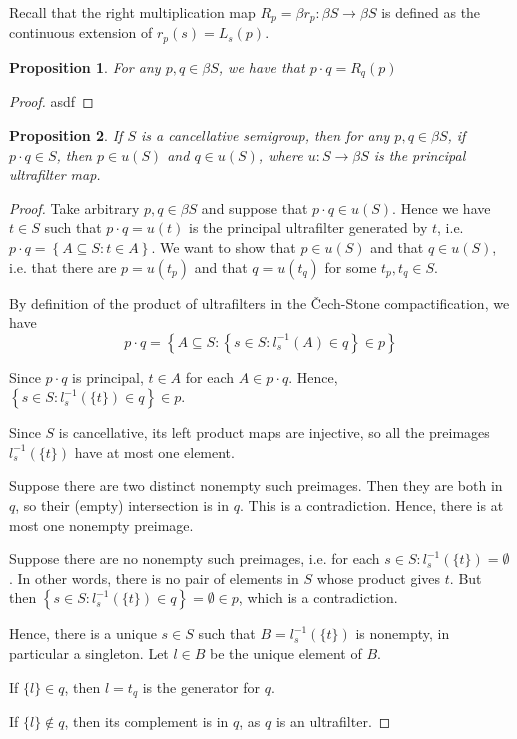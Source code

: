 \documentclass[11pt,letterpaper]{article}
\newtheorem{prop}{Proposition}
\newcommand{\inv}{^{-1}}
\newcommand{\setof}[1]{\left\{#1\right\}}
\newcommand{\cechstone}{\v{C}ech-Stone}
\begin{document}
Recall that the right multiplication map
$R_p = \beta r_p : \beta S \to \beta S$ is defined as the continuous extension
of $r_p(s) = L_s(p)$.

\begin{prop}
    For any $p, q \in \beta S$, we have that $p \cdot q = R_q (p)$
\end{prop}

\begin{proof}
    asdf
\end{proof}

\begin{prop}
    If $S$ is a cancellative semigroup,
    then for any $p, q \in \beta S$,
    if $p \cdot q \in S$, then $p \in u(S)$ and $q \in u(S)$,
    where $u : S \to \beta S$ is the principal ultrafilter map.
\end{prop}

\begin{proof}
    Take arbitrary $p, q \in \beta S$ and suppose that $p \cdot q \in u(S)$.
    Hence we have $t \in S$ such that $p \cdot q = u(t)$ is the principal
    ultrafilter generated by $t$,
    i.e. $p \cdot q = \setof{A \subseteq S : t \in A}$.
    We want to show that $p \in u(S)$ and that $q \in u(S)$,
    i.e. that there are $p = u(t_p)$ and that $q = u(t_q)$
    for some $t_p, t_q \in S$.

    By definition of the product of ultrafilters in the \cechstone{}
    compactification, we have
    \begin{equation*}
        p \cdot q = \setof{
            A \subseteq S :
            \setof{
                s \in S :
                l_s\inv(A) \in q
            }
            \in p
        }
    \end{equation*}

    Since $p \cdot q$ is principal, $t \in A$ for each $A \in p \cdot q$.
    Hence, $\setof{s \in S : l_s\inv(\{t\}) \in q} \in p$.

    Since $S$ is cancellative, its left product maps are injective,
    so all the preimages $l_s\inv(\{t\})$ have at most one element.

    Suppose there are two distinct nonempty such preimages. Then they are both
    in $q$, so their (empty) intersection is in $q$. This is a contradiction.
    Hence, there is at most one nonempty preimage.

    Suppose there are no nonempty such preimages,
    i.e. for each $s \in S: l_s\inv(\{t\}) = \emptyset$.
    In other words, there is no pair of elements in $S$ whose product gives
    $t$.
    But then $\setof{ s \in S : l_s\inv(\{t\}) \in q } = \emptyset \in p$,
    which is a contradiction.

    Hence, there is a unique $s \in S$ such that $B = l_s\inv(\{t\})$ is
    nonempty, in particular a singleton.
    Let $l \in B$ be the unique element of $B$.

    If $\{l\} \in q$, then $l = t_q$ is the generator for $q$.

    If $\{l\} \notin q$, then its complement is in $q$, as $q$ is an
    ultrafilter.
\end{proof}
\end{document}
